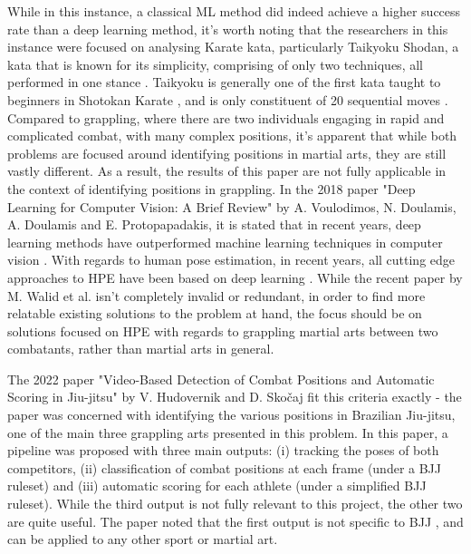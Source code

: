 \documentclass[a4paper, oneside, 11pt]{article}
\begin{document}
While in this instance, a classical ML method did indeed achieve a higher success rate than a deep learning method, it's worth noting that the researchers in this instance were focused on analysing Karate kata, particularly Taikyoku Shodan, a kata that is known for its simplicity, comprising of only two techniques, all performed in one stance \cite{taikyoku1}\cite{taikyoku2}. Taikyoku is generally one of the first kata taught to beginners in Shotokan Karate \cite{taikyoku1}\cite{taikyoku3}, and is only constituent of 20 sequential moves \cite{KarateKata}\cite{taikyoku1}. Compared to grappling, where there are two individuals engaging in rapid and complicated combat, with many complex positions, it's apparent that while both problems are focused around identifying positions in martial arts, they are still vastly different. As a result, the results of this paper are not fully applicable in the context of identifying positions in grappling. In the 2018 paper "Deep Learning for Computer Vision: A Brief Review" by A. Voulodimos, N. Doulamis, A. Doulamis and E. Protopapadakis, it is stated that in recent years, deep learning methods have outperformed machine learning techniques in computer vision \cite{ComputerVisionAndDeepLearning}. With regards to human pose estimation, in recent years, all cutting edge approaches to HPE have been based on deep learning \cite{IdentifyingBJJPositions}. While the recent paper by M. Walid et al. isn't completely invalid or redundant, in order to find more relatable existing solutions to the problem at hand, the focus should be on solutions focused on HPE with regards to grappling martial arts between two combatants, rather than martial arts in general.

The 2022 paper "Video-Based Detection of Combat Positions and Automatic Scoring in Jiu-jitsu" by V. Hudovernik and D. Skočaj \cite{IdentifyingBJJPositions} fit this criteria exactly - the paper was concerned with identifying the various positions in Brazilian Jiu-jitsu, one of the main three grappling arts presented in this problem. In this paper, a pipeline was proposed  with three main outputs: (i) tracking the poses of both competitors, (ii) classification of combat positions at each frame (under a BJJ ruleset) and (iii) automatic scoring for each athlete (under a simplified BJJ ruleset). While the third output is not fully relevant to this project, the other two are quite useful. The paper noted that the first output is not specific to BJJ \cite{IdentifyingBJJPositions}, and can be applied to any other sport or martial art.
\end{document}
